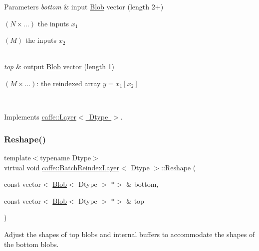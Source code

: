 \begin{DoxyParams}{Parameters}
{\em bottom} & input \mbox{\hyperlink{classcaffe_1_1_blob}{Blob}} vector (length 2+)
\begin{DoxyEnumerate}
\item $ (N \times ...) $ the inputs $ x_1 $
\item $ (M) $ the inputs $ x_2 $ 
\end{DoxyEnumerate}\\
\hline
{\em top} & output \mbox{\hyperlink{classcaffe_1_1_blob}{Blob}} vector (length 1)
\begin{DoxyEnumerate}
\item $ (M \times ...) $\+: the reindexed array $ y = x_1[x_2] $ 
\end{DoxyEnumerate}\\
\hline
\end{DoxyParams}


Implements \mbox{\hyperlink{classcaffe_1_1_layer_a576ac6a60b1e99fe383831f52a6cea77}{caffe\+::\+Layer$<$ Dtype $>$}}.

\mbox{\label{classcaffe_1_1_batch_reindex_layer_a7fac1505092f43372ed39a99a1405d4b}} 
\subsubsection{\texorpdfstring{Reshape()}{Reshape()}\hspace{0.1cm}{\footnotesize\ttfamily [1/2]}}
{\footnotesize\ttfamily template$<$typename Dtype$>$ \\
virtual void \mbox{\hyperlink{classcaffe_1_1_batch_reindex_layer}{caffe\+::\+Batch\+Reindex\+Layer}}$<$ Dtype $>$\+::Reshape (\begin{DoxyParamCaption}\item[{const vector$<$ \mbox{\hyperlink{classcaffe_1_1_blob}{Blob}}$<$ Dtype $>$ $\ast$$>$ \&}]{bottom,  }\item[{const vector$<$ \mbox{\hyperlink{classcaffe_1_1_blob}{Blob}}$<$ Dtype $>$ $\ast$$>$ \&}]{top }\end{DoxyParamCaption})\hspace{0.3cm}{\ttfamily [virtual]}}



Adjust the shapes of top blobs and internal buffers to accommodate the shapes of the bottom blobs. 


